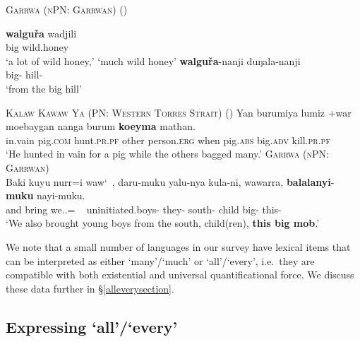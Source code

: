 \documentclass[12pt,egregdoesnotlikesansseriftitles]{scrartcl}
\begin{document}
\begin{exe}
  \ex \textsc{Garrwa (nPN: Garrwan)} \hfill(\citealt{furby77}) \label{bigquant1}
  \begin{xlist}
    \ex \gll \textbf{walgu\v{r}a} wadjili\\
    big wild.honey\\
    \glt `a lot of wild honey,' `much wild honey' %
    \ex \gll \textbf{walgu\v{r}a}-nanji duŋala-nanji\\
    big-\Abl{} hill-\Abl\\
    \glt `from the big hill' %
  \end{xlist}
  \ex \textsc{Kalaw Kawaw Ya (PN: Western Torres Strait)} \hfill(\citealt[141]{fo91}) \label{bigquant2}
  \gll Yan burumiya lumiz +war moebaygan nanga burum        \textbf{koeyma}    mathan.\\
  in.vain pig.\textsc{com} hunt.\textsc{pr.pf} other person.\textsc{erg} when   pig.\textsc{abs}    big.\textsc{adv}    kill.\textsc{pr.pf}\\
  \glt `He hunted in vain for a pig while the others bagged many.'
  \ex \textsc{Garrwa (nPN: Garrwan)}\hfill {}\\
  \gll Baki kuyu nurr=i waw\char`~, daru-muku yalu-nya kula-ni, wawarra, \textbf{balalanyi}-\textbf{muku} nayi-muku.\\
  and bring we.\Excl.\Nom=\Pst{} {\ } uninitiated.boys-\Pl{} they-\Acc{} south-\Abl{} child big-\Pl{} this-\Pl\\
  \glt `We also brought young boys from the south, child(ren), \textbf{this big mob}.' %
\end{exe}

We note  that a small number of languages in our survey have lexical items that can be interpreted as either `many'/`much' or `all'/`every', i.e.\ they are compatible with both existential and universal quantificational force. We discuss these data further in \S\ref{alleverysection}.

\subsection{Expressing `all'/`every' \label{alleverysection}}
\end{document}
